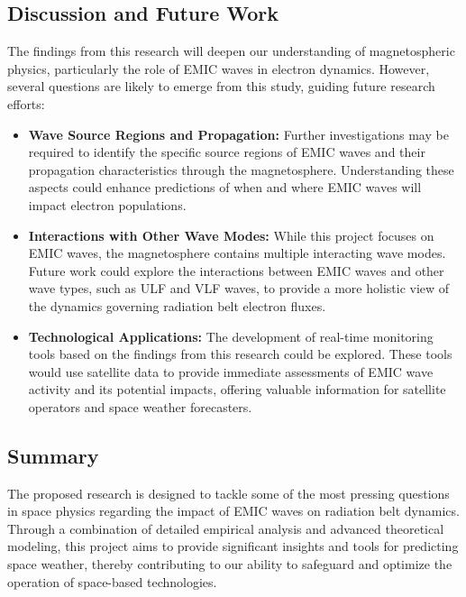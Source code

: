 \documentclass[
  letterpaper,
  DIV=11,
  numbers=noendperiod]{scrartcl}
\begin{document}
\subsection{Discussion and Future Work}\label{discussion-and-future-work}

The findings from this research will deepen our understanding of magnetospheric physics, particularly the role of EMIC waves in electron dynamics. However, several questions are likely to emerge from this study, guiding future research efforts:

\begin{itemize}
\item
  \textbf{Wave Source Regions and Propagation:} Further investigations may be required to identify the specific source regions of EMIC waves and their propagation characteristics through the magnetosphere. Understanding these aspects could enhance predictions of when and where EMIC waves will impact electron populations.
\item
  \textbf{Interactions with Other Wave Modes:} While this project focuses on EMIC waves, the magnetosphere contains multiple interacting wave modes. Future work could explore the interactions between EMIC waves and other wave types, such as ULF and VLF waves, to provide a more holistic view of the dynamics governing radiation belt electron fluxes.
\item
  \textbf{Technological Applications:} The development of real-time monitoring tools based on the findings from this research could be explored. These tools would use satellite data to provide immediate assessments of EMIC wave activity and its potential impacts, offering valuable information for satellite operators and space weather forecasters.
\end{itemize}

\subsection{Summary}\label{summary}

The proposed research is designed to tackle some of the most pressing questions in space physics regarding the impact of EMIC waves on radiation belt dynamics. Through a combination of detailed empirical analysis and advanced theoretical modeling, this project aims to provide significant insights and tools for predicting space weather, thereby contributing to our ability to safeguard and optimize the operation of space-based technologies.
\end{document}

